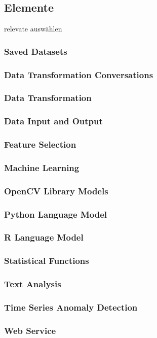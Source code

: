\subsection{Elemente}
relevate auswählen
\subsubsection{Saved Datasets}
\subsubsection{Data Transformation Conversations}
\subsubsection{Data Transformation}
\subsubsection{Data Input and Output}
\subsubsection{Feature Selection}
\subsubsection{Machine Learning}
\subsubsection{OpenCV Library Models}
\subsubsection{Python Language Model}
\subsubsection{R Language Model}
\subsubsection{Statistical Functions}
\subsubsection{Text Analysis}
\subsubsection{Time Series Anomaly Detection}
\subsubsection{Web Service}
